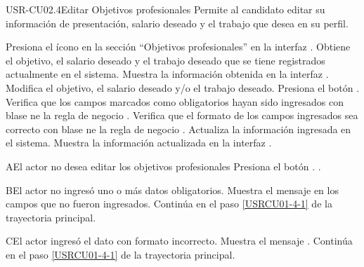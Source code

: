 \begin{UseCase}[]{USR-CU02.4}{Editar Objetivos profesionales}{
	Permite al candidato editar su información de presentación, salario deseado y el trabajo que desea en su perfil.
}
\end{UseCase}

\begin{UCtrayectoria}
	\UCpaso [\UCactor] Presiona el ícono \IUEditar{} en la sección ``Objetivos profesionales'' en la interfaz . 
	\UCpaso Obtiene el objetivo, el salario deseado y el trabajo deseado que se tiene registrados actualmente en el sistema.
	\UCpaso [\UCsist] Muestra la información obtenida en la interfaz .
	\UCpaso \label{USRCU01-4-1} Modifica el objetivo, el salario deseado y/o el trabajo deseado.
	\UCpaso [\UCsist] Presiona el botón .
	\UCpaso Verifica que los campos marcados como obligatorios hayan sido ingresados con blase ne la regla de negocio .
	\UCpaso Verifica que el formato de los campos ingresados sea correcto con blase ne la regla de negocio .
	\UCpaso Actualiza la información ingresada en el sistema.
	\UCpaso Muestra la información actualizada en la interfaz . 
\end{UCtrayectoria}

\begin{UCtrayectoriaA}{A}{El actor no desea editar los objetivos profesionales}
	\UCpaso [\UCsist] Presiona el botón .
	.
\end{UCtrayectoriaA} 

\begin{UCtrayectoriaA}{B}{El actor no ingresó uno o más datos obligatorios.}
	\UCpaso [\UCsist] Muestra el mensaje  en los campos que no fueron ingresados.
	\UCpaso [\UCsist] Continúa en el paso \ref{USRCU01-4-1} de la trayectoria principal.
\end{UCtrayectoriaA} 

\begin{UCtrayectoriaA}{C}{El actor ingresó el dato con formato incorrecto.}
	\UCpaso [\UCsist] Muestra el mensaje .
	\UCpaso [\UCsist] Continúa en el paso \ref{USRCU01-4-1} de la trayectoria principal.
\end{UCtrayectoriaA}




